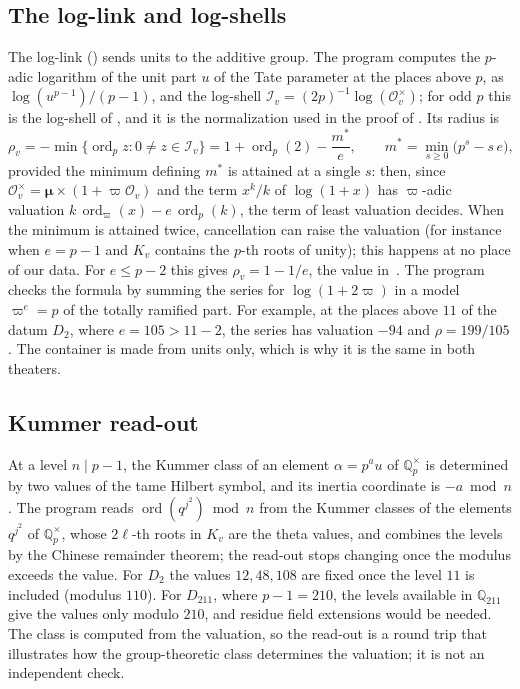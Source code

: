 \documentclass[11pt,a4paper]{article}
\newcommand{\Q}{\mathbb{Q}}
\newcommand{\cO}{\mathcal{O}}
\newcommand{\cI}{\mathcal{I}}
\newcommand{\ord}{\operatorname{ord}}
\begin{document}
\subsection{The log-link and log-shells}\label{sec:log}
The log-link (\cite[Def.~1.1]{IUT3}) sends units to the additive group. The program computes the $p$-adic
logarithm of the unit part $u$ of the Tate parameter at the places above $p$, as $\log(u^{p-1})/(p-1)$, and the
log-shell $\cI_v=(2p)^{-1}\log(\cO_v^\times)$; for odd $p$ this is the log-shell of \cite[\S1]{IUT3}, and it is the
normalization used in the proof of \cite[Thm.~1.10, Step~(v)]{IUT4}. Its radius is
\[
\rho_v=-\min\{\ord_p z: 0\ne z\in\cI_v\}=1+\ord_p(2)-\frac{m^*}{e},\qquad m^*=\min_{s\ge0}\bigl(p^s-s\,e\bigr),
\]
provided the minimum defining $m^*$ is attained at a single $s$: then, since
$\cO_v^\times=\boldsymbol\mu\times(1+\varpi\cO_v)$ and the term $x^k/k$ of $\log(1+x)$ has $\varpi$-adic valuation
$k\,\ord_\varpi(x)-e\,\ord_p(k)$, the term of least valuation decides. When the minimum is attained twice,
cancellation can raise the valuation (for instance when $e=p-1$ and $K_v$ contains the $p$-th roots of unity); this
happens at no place of our data. For $e\le p-2$ this gives $\rho_v=1-1/e$, the value
in~\cite{LANAiut}. The program checks the formula by summing the series for $\log(1+2\varpi)$ in a model
$\varpi^e=p$ of the totally ramified part. For example, at the places above $11$ of the datum $D_2$, where
$e=105>11-2$, the series has valuation $-94$ and $\rho=199/105$. The container is made from units only, which
is why it is the same in both theaters.

\subsection{Kummer read-out}\label{sec:kummer}
At a level $n\mid p-1$, the Kummer class of an element $\alpha=p^{a}u$ of $\Q_p^\times$ is determined by two
values of the tame Hilbert symbol, and its inertia coordinate is $-a\bmod n$. The program reads
$\ord(q^{j^2})\bmod n$ from the Kummer classes of the elements $q^{j^2}$ of $\Q_p^\times$, whose $2\ell$-th roots in
$K_v$ are the theta values, and combines the levels by the Chinese remainder theorem; the read-out stops changing once the modulus exceeds the value. For $D_2$ the values $12,48,108$ are
fixed once the level $11$ is included (modulus $110$). For $D_{211}$, where $p-1=210$, the levels available in
$\Q_{211}$ give the values only modulo $210$, and residue field extensions would be needed. The class is computed
from the valuation, so the read-out is a round trip that illustrates how the group-theoretic class determines the
valuation; it is not an independent check.
\end{document}
